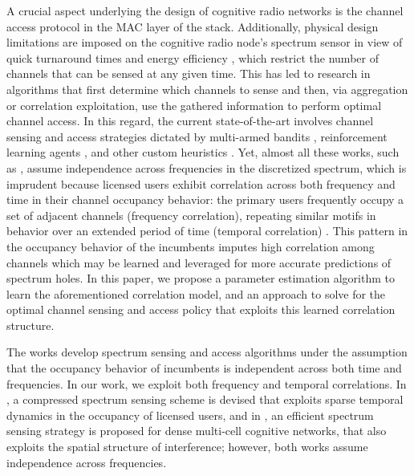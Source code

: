 \documentclass[10pt,twocolumn]{IEEEtran}
\begin{document}
A crucial aspect underlying the design of cognitive radio networks is the channel access protocol in the MAC layer of the stack. Additionally, physical design limitations are imposed on the cognitive radio node's spectrum sensor in view of quick turnaround times and energy efficiency \cite{5990482}, which restrict the number of channels that can be sensed at any given time. This has led to research in algorithms that first determine which channels to sense and then, via aggregation or correlation exploitation, use the gathered information to perform optimal channel access. In this regard, the current state-of-the-art involves channel sensing and access strategies dictated by multi-armed bandits \cite{7094730}, reinforcement learning agents \cite{6507570}, and other custom heuristics \cite{6956794, 4554696}. Yet, almost all these works, such as \cite{7094730, 6507570}, assume independence across frequencies in the discretized spectrum, which is imprudent because licensed users exhibit correlation across both frequency and time in their channel occupancy behavior: the primary users frequently occupy a set of adjacent channels (frequency correlation), repeating similar motifs in behavior over an extended period of time (temporal correlation) \cite{6188346, 4213046, McHenry:2006:CSO:1234388.1234389}. This pattern in the occupancy behavior of the incumbents imputes high correlation among channels which may be learned and  leveraged for more accurate predictions of spectrum holes. In this paper, we propose a parameter estimation algorithm to learn the aforementioned correlation model, and an approach to solve for the optimal channel sensing and access policy that exploits this learned correlation structure.

 The works \cite{7094730, 5167826, 7895211} develop spectrum sensing and access algorithms under the assumption that the occupancy behavior of incumbents is independent across both time and frequencies. In our work, we exploit both frequency and temporal correlations. In \cite{7336513}, a compressed spectrum sensing scheme is devised that exploits sparse temporal dynamics in the occupancy of licensed users, and in \cite{8571293}, an efficient spectrum sensing strategy is proposed for dense multi-cell cognitive networks, that also exploits the spatial structure of interference; however, both works assume independence across frequencies.
\end{document}
